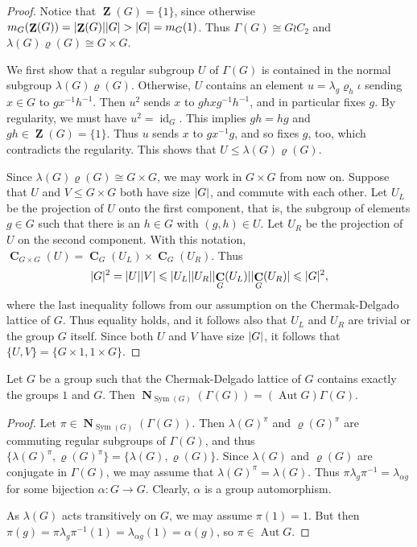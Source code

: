 \documentclass[ALCO,Unicode]{cedram}
\renewcommand{\rho}{\varrho}
\renewcommand{\leq}{\leqslant}
\newcommand{\iso}{\cong}    %
\newcommand{\Sym}[1]{\operatorname{Sym}(#1)}  %
\DeclarePairedDelimiter{\card}{\lvert}{\rvert}  %
\DeclareMathOperator{\Aut}{Aut}
\DeclareMathOperator{\Zentr}{\mathbf{Z}}     %
\DeclareMathOperator{\Centrl}{\mathbf{C}}     %
\DeclareMathOperator{\Norml}{\mathbf{N}}
\DeclareMathOperator{\Id}{id}       %
\begin{document}
\begin{proof}
    Notice that $\Zentr(G)=\{1\}$, since otherwise
    $m_G(\Zentr(G))=\card{\Zentr(G)}\card{G} > \card{G} = m_G(1)$.
    Thus $\Gamma(G)\iso G\wr C_2$
    and $\lambda(G)\rho(G) \iso G\times G$.
    
    We first show that a regular subgroup $U$ of 
    $\Gamma(G)$ is contained in the normal subgroup
    $\lambda(G) \rho(G)$.
    Otherwise, $U$
    contains an element $u = \lambda_g \rho_h \iota$
    sending $x\in G$ to $ g x^{-1} h^{-1}$.
    Then $u^2$ sends $x$ to $gh x g^{-1}h^{-1}$,
    and in particular fixes $g$.
    By regularity, we must have $u^2 = \Id_G$. 
    This implies 
    $gh = hg $ and 
    $gh\in \Zentr(G) = \{1\}$.
    Thus $u$ sends $x$ to $g x^{-1}g$,
    and so fixes $g$, too, 
    which contradicts the regularity. 
    This shows that $U \leq \lambda(G) \rho(G)$.
    
    Since $\lambda(G) \rho(G)\iso G\times G$, we may work
    in $G\times G$ from now on.
    Suppose that $U$ and $V\leq G\times G$ 
    both have size $\card{G}$,
    and commute with each other.
    Let $U_L$ be the projection of $U$ 
    onto the first component, 
    that is, the subgroup of elements
    $g\in G$ such that there is an $h\in G$
    with $(g,h)\in U$.
    Let $U_R$ be the projection of $U$ on the second component.
    With this notation,
    $\Centrl_{G\times G}(U) = \Centrl_{G}(U_L)\times \Centrl_{G}(U_R)$.
    Thus 
    \[ \card{G}^2 
       = \card{U}\card{V}
       \leq \card{U_L}\card{U_R}
            \card{\Centrl_{G}(U_L)}\card{\Centrl_{G}(U_R)}
       \leq \card{G}^2,
    \]
    where the last inequality follows from our assumption
    on the Chermak-Delgado lattice of $G$.
    Thus equality holds, and it follows also that
    $U_L$ and $U_R$ are trivial or the group $G$ itself.
    Since both $U$ and $V$ have size $\card{G}$,
    it follows that
    $\{U,V\} = \{G\times 1, 1\times G\}$.
\end{proof}

\begin{cor}\label{c:normlgamma}
  Let $G$ be a group such that the Chermak-Delgado lattice of $G$
  contains exactly the groups $1$ and $G$.
  Then $\Norml_{\Sym{G}}(\Gamma(G)) = (\Aut G)\Gamma(G)$.    
\end{cor}

\begin{proof}
  Let $\pi \in \Norml_{\Sym{G}}(\Gamma(G))$.
  Then $\lambda(G)^{\pi}$ and $\rho(G)^{\pi}$
  are commuting regular subgroups of $\Gamma(G)$,
  and thus 
  $\{\lambda(G)^{\pi},\rho(G)^{\pi}\}
   = \{ \lambda(G), \rho(G)\} $.
  Since $\lambda(G)$ and $\rho(G)$ are conjugate in 
  $\Gamma(G)$, 
  we may assume that $\lambda(G)^{\pi}= \lambda(G)$.
  Thus $\pi \lambda_g \pi^{-1} = \lambda_{\alpha g}$
  for some bijection $\alpha\colon G\to G$.
  Clearly, $\alpha$ is a group automorphism.
  
  As $\lambda(G)$ acts transitively on $G$, we may assume
  $\pi(1) = 1$. 
  But then 
  $\pi(g) = \pi\lambda_g \pi^{-1}(1)
          = \lambda_{\alpha g}(1)
          = \alpha(g)$,
  so $\pi\in \Aut G$.
\end{proof}
\end{document}
